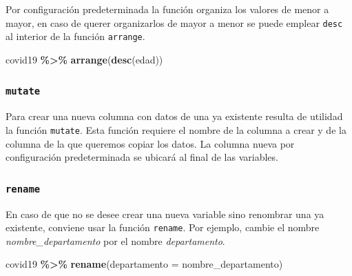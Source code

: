 \documentclass[
]{article}
\newenvironment{Shaded}{\begin{snugshade}}{\end{snugshade}}
\newcommand{\AttributeTok}[1]{\textcolor[rgb]{0.13,0.29,0.53}{#1}}
\newcommand{\FunctionTok}[1]{\textcolor[rgb]{0.13,0.29,0.53}{\textbf{#1}}}
\newcommand{\NormalTok}[1]{#1}
\newcommand{\OtherTok}[1]{\textcolor[rgb]{0.56,0.35,0.01}{#1}}
\newcommand{\SpecialCharTok}[1]{\textcolor[rgb]{0.81,0.36,0.00}{\textbf{#1}}}
\begin{document}
Por configuración predeterminada la función organiza los valores de
menor a mayor, en caso de querer organizarlos de mayor a menor se puede
emplear \texttt{desc} al interior de la función \texttt{arrange}.

\begin{Shaded}
\begin{Highlighting}[]
\NormalTok{covid19 }\SpecialCharTok{\%\textgreater{}\%} \FunctionTok{arrange}\NormalTok{(}\FunctionTok{desc}\NormalTok{(edad))}
\end{Highlighting}
\end{Shaded}

\subsubsection{\texorpdfstring{\texttt{mutate}}{mutate}}\label{mutate}

Para crear una nueva columna con datos de una ya existente resulta de
utilidad la función \texttt{mutate}. Esta función requiere el nombre de
la columna a crear y de la columna de la que queremos copiar los datos.
La columna nueva por configuración predeterminada se ubicará al final de
las variables.

\begin{Shaded}
\end{Shaded}

\subsubsection{\texorpdfstring{\texttt{rename}}{rename}}\label{rename}

En caso de que no se desee crear una nueva variable sino renombrar una
ya existente, conviene usar la función \texttt{rename}. Por ejemplo,
cambie el nombre \emph{nombre\_departamento} por el nombre
\emph{departamento}.

\begin{Shaded}
\begin{Highlighting}[]
\NormalTok{covid19 }\SpecialCharTok{\%\textgreater{}\%} \FunctionTok{rename}\NormalTok{(}\AttributeTok{departamento =}\NormalTok{ nombre\_departamento)}
\end{Highlighting}
\end{Shaded}
\end{document}
